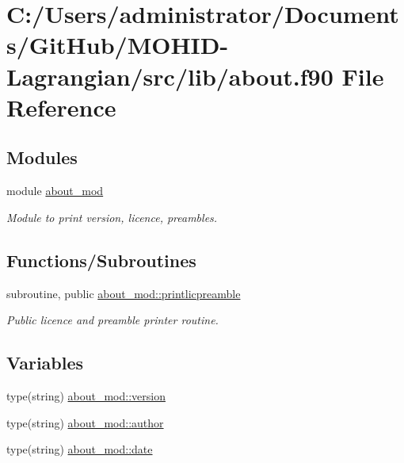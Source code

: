 \hypertarget{about_8f90}{}\section{C\+:/\+Users/administrator/\+Documents/\+Git\+Hub/\+M\+O\+H\+I\+D-\/\+Lagrangian/src/lib/about.f90 File Reference}
\label{about_8f90}
\subsection*{Modules}
\begin{DoxyCompactItemize}
\item 
module \hyperlink{namespaceabout__mod}{about\+\_\+mod}
\begin{DoxyCompactList}\small\item\em Module to print version, licence, preambles. \end{DoxyCompactList}\end{DoxyCompactItemize}
\subsection*{Functions/\+Subroutines}
\begin{DoxyCompactItemize}
\item 
subroutine, public \hyperlink{namespaceabout__mod_a9fb866e1576b843b42649d84b80f4b52}{about\+\_\+mod\+::printlicpreamble}
\begin{DoxyCompactList}\small\item\em Public licence and preamble printer routine. \end{DoxyCompactList}\end{DoxyCompactItemize}
\subsection*{Variables}
\begin{DoxyCompactItemize}
\item 
type(string) \hyperlink{namespaceabout__mod_af0051041c5a98e3eb7284580236db3a0}{about\+\_\+mod\+::version}
\item 
type(string) \hyperlink{namespaceabout__mod_a7c3a72ae7ba5fc7d8a4bf133605f58c3}{about\+\_\+mod\+::author}
\item 
type(string) \hyperlink{namespaceabout__mod_aaac12f65380fb0f10916b3744d9e5a0b}{about\+\_\+mod\+::date}
\end{DoxyCompactItemize}
